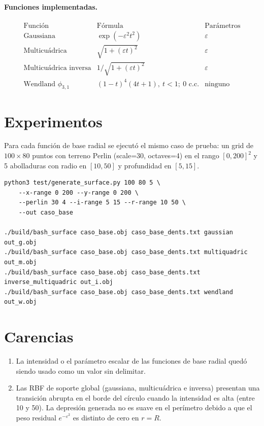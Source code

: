 \documentclass[12pt, letterpaper]{article}
\begin{document}
\paragraph{Funciones implementadas.}

\[
\begin{array}{l|l|l}
\text{Función} & \text{Fórmula} & \text{Parámetros} \\ \hline
\text{Gaussiana} & \exp(-\varepsilon^2 t^2) & \varepsilon \\
\text{Multicuádrica} & \sqrt{1 + (\varepsilon t)^2} & \varepsilon \\
\text{Multicuádrica inversa} & 1 / \sqrt{1 + (\varepsilon t)^2} & \varepsilon \\
\text{Wendland } \phi_{3,1} & (1 - t)^4 (4t + 1),\ t < 1;\ 0\text{ c.c.} & \text{ninguno}
\end{array}
\]

\section{Experimentos}

Para cada función de base radial se ejecutó el mismo caso de prueba:
un grid de \(100 \times 80\) puntos con terreno Perlin (scale=30, octaves=4)
en el rango \([0, 200]^2\) y 5 abolladuras con radio en \([10, 50]\) y
profundidad en \([5, 15]\).

\begin{verbatim}
python3 test/generate_surface.py 100 80 5 \
    --x-range 0 200 --y-range 0 200 \
    --perlin 30 4 --i-range 5 15 --r-range 10 50 \
    --out caso_base

./build/bash_surface caso_base.obj caso_base_dents.txt gaussian            out_g.obj
./build/bash_surface caso_base.obj caso_base_dents.txt multiquadric        out_m.obj
./build/bash_surface caso_base.obj caso_base_dents.txt inverse_multiquadric out_i.obj
./build/bash_surface caso_base.obj caso_base_dents.txt wendland            out_w.obj
\end{verbatim}

\section{Carencias}

\begin{enumerate}
    \item La intensidad o el parámetro escalar de las funciones de base radial
    quedó siendo usado como un valor sin delimitar.
    \item Las RBF de soporte global (gaussiana, multicuádrica e inversa)
    presentan una transición abrupta en el borde del círculo cuando la
    intensidad es alta (entre 10 y 50). La depresión generada no es suave
    en el perímetro debido a que el peso residual \(e^{-\varepsilon^2}\)
    es distinto de cero en \(r = R\).
\end{enumerate}
\end{document}
